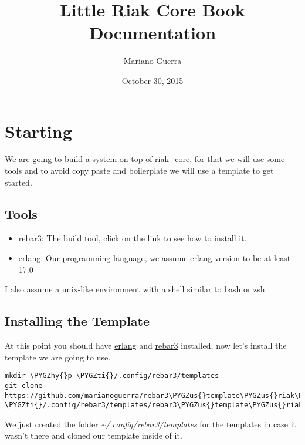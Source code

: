 \documentclass[letterpaper,10pt,english]{sphinxmanual}
\title{Little Riak Core Book Documentation}
\date{October 30, 2015}
\author{Mariano Guerra}
\def\PYGZus{\char`\_}
\def\PYGZhy{\char`\-}
\def\PYGZti{\char`\~}
\begin{document}
\maketitle
\tableofcontents
{}\label{index::doc}



\chapter{Starting}
\label{starting:little-riak-core-book}\label{starting::doc}\label{starting:starting}
We are going to build a system on top of riak\_core, for that we will use some
tools and to avoid copy paste and boilerplate we will use a template to get
started.


\section{Tools}
\label{starting:tools}\begin{itemize}
\item {} 
\href{http://www.rebar3.org/docs/getting-started}{rebar3}: The build tool, click on the link to see how to install it.

\item {} 
\href{http://www.erlang.org/}{erlang}: Our programming language, we assume erlang version to be at least 17.0

\end{itemize}

I also assume a unix-like environment with a shell similar to bash or zsh.


\section{Installing the Template}
\label{starting:installing-the-template}
At this point you should have \href{http://www.erlang.org/}{erlang} and \href{http://www.rebar3.org/docs/getting-started}{rebar3} installed, now let's install the
template we are going to use.

\begin{Verbatim}[commandchars=\\\{\}]
mkdir \PYGZhy{}p \PYGZti{}/.config/rebar3/templates
git clone https://github.com/marianoguerra/rebar3\PYGZus{}template\PYGZus{}riak\PYGZus{}core/ \PYGZti{}/.config/rebar3/templates/rebar3\PYGZus{}template\PYGZus{}riak\PYGZus{}core
\end{Verbatim}

We just created the folder \emph{\textasciitilde{}/.config/rebar3/templates} for the templates in
case it wasn't there and cloned our template inside of it.
\end{document}
